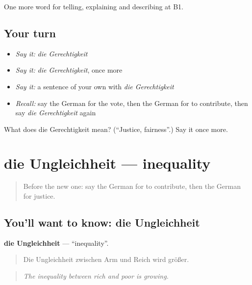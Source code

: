 \begin{grammarlens}[title={What you've built}]
One more word for telling, explaining and describing at B1.
\end{grammarlens}

\subsection*{Your turn}
\begin{itemize}
\raggedright
  \item \emph{Say it:} \emph{die Gerechtigkeit}
  \item \emph{Say it:} \emph{die Gerechtigkeit}, once more
  \item \emph{Say it:} a sentence of your own with \emph{die Gerechtigkeit}
  \item \emph{Recall:} say the German for the vote, then the German for to contribute, then say \emph{die Gerechtigkeit} again
\end{itemize}

\begin{tcolorbox}[breakable,colback=teal!4,colframe=teal!35!black,title={Before you move on}]
What does die Gerechtigkeit mean? (\textquotedblleft{}Justice, fairness\textquotedblright{}.) Say it once more.
\end{tcolorbox}
\section[die Ungleichheit]{die Ungleichheit — inequality}

\label{lesson:GE-C359-ungleichheit}



\begin{quote}
Before the new one: say the German for to contribute, then the German for justice.
\end{quote}

\subsection*{You'll want to know: die Ungleichheit}
\textbf{die Ungleichheit} — \textquotedblleft{}inequality\textquotedblright{}.

\begin{quote}
Die Ungleichheit zwischen Arm und Reich wird größer.
\end{quote}

\begin{quote}
\emph{The inequality between rich and poor is growing.}
\end{quote}

